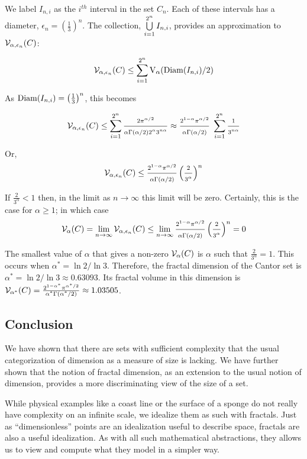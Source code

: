 {We label $I_{n,i}$ as the $i^{th}$ interval in the set
$C_n$. Each of these intervals has a diameter, $\epsilon_n = \left(\frac{1}{3}\right)^n$.
The collection, $\bigcup_{i=1}^{2^n}\limits I_{n,i}$, provides an
approximation to ${\cal V}_{\alpha, \epsilon_n}(C)$:


$$
{\cal V}_{\alpha, \epsilon_n}(C) \le \sum_{i=1}^{2^n} {\rm V}_\alpha({\rm
  Diam}(I_{n,i}) / 2)
$$

As ${\rm Diam}(I_{n,i}) = \left(\frac{1}{3}\right)^n$, this becomes


$$
{\cal V}_{\alpha, \epsilon_n}(C) \le \sum_{i=1}^{2^n} \frac{2
  \pi^{\alpha/2}}{ \alpha \Gamma(\alpha/2) 2^\alpha 3^{n\alpha}} 
  \approx  \frac{
  2^{1 - \alpha} \pi^{\alpha/2}}{\alpha \Gamma(\alpha/2)} \;
  \sum_{i=1}^{2^n}  
\frac{1}{3^{n\alpha}}
$$

Or, 
$$
{\cal V}_{\alpha, \epsilon_n}(C) \le \frac{ 2^{1-\alpha} \pi^{\alpha/2}}{\alpha
  \Gamma(\alpha/2)} \left(\frac{2}{3^\alpha}\right)^n
$$


If $\frac{2}{3^\alpha} < 1$ then, in the limit as 
$n \rightarrow \infty$ 
this limit will be zero. Certainly,
this is the case for $\alpha \ge 1$; in which case 
$$
{\cal V}_\alpha(C) =  \lim_{n \rightarrow \infty} {\cal V}_{\alpha, \epsilon_n}(C) \le \lim_{n \rightarrow \infty}  \frac{ 2^{1-\alpha} 
\pi^{\alpha/2}}{\alpha
  \Gamma(\alpha/2)} \left(\frac{2}{3^\alpha}\right)^n = 0 
$$

The smallest value of $\alpha$ that gives a non-zero ${\cal V}_\alpha(C)$ 
is $\alpha$ such that $\frac{2}{3^\alpha} = 1$. 
This occurs when
$\alpha^* = \ln 2 / \ln 3$. Therefore, the fractal dimension of the
Cantor set is $\alpha^* = \ln 2 / \ln 3 \approx 0.63093$. 
Its fractal volume in this
dimension is ${\cal V}_{\alpha^*}(C) =  \frac{2^{1-\alpha^*} 
\pi^{\alpha^*/2}}{\alpha^*
\Gamma(\alpha^* / 2)} \approx 1.03505 $.

\subsection{Conclusion}
We have shown that there are sets with sufficient complexity that the
usual categorization of dimension as a measure of size is lacking. 
We have further shown
that the notion of fractal dimension, as an extension to the usual
notion of dimension, provides a more discriminating view of the size
of a set.

While physical examples like a coast line or the surface of a sponge do 
not really have
complexity on an infinite scale, we idealize them as such with
fractals. Just as ``dimensionless'' points are an idealization useful
to describe space, fractals are also a useful idealization. 
As with all such mathematical abstractions, they 
allows us to view and compute what they model in a simpler way.

}
